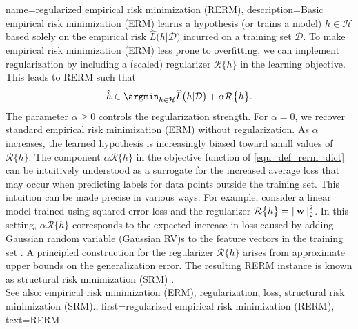 {
{name={regularized empirical risk minimization (RERM)}, 
	description={Basic empirical risk minimization (ERM) learns a hypothesis (or trains a model) $h \in \mathcal{H}$ 
		based solely on the empirical risk $\widehat{L}\big(h|\mathcal{D}\big)$ incurred on a training set $\mathcal{D}$. 
		To make empirical risk minimization (ERM) less prone to overfitting, we can implement regularization by 
		including a (scaled) regularizer $\mathcal{R}\big\{ h \big\}$ in the learning objective. 
		This leads to RERM such that
		\begin{equation}
			\label{equ_def_rerm_dict}
			\hat{h} \in \argmin_{h \in \mathcal{H}} \widehat{L}\big(h|\mathcal{D}\big) + \alpha \mathcal{R}\big\{ h \big\}.
		\end{equation}
		The parameter $\alpha \geq 0$ controls the regularization strength. 
		For $\alpha = 0$, we recover standard empirical risk minimization (ERM) without regularization. As $\alpha$ increases, the 
		learned hypothesis is increasingly biased toward small values of $\mathcal{R}\big\{ h \big\}$. 
		The component $\alpha \mathcal{R}\big\{ h \big\}$ in the objective function of \eqref{equ_def_rerm_dict} 
		can be intuitively understood as a surrogate for the increased average loss that may 
		occur when predicting labels for data points outside the training set. This intuition  
		can be made precise in various ways. For example, consider a linear model trained using squared error loss 
		and the regularizer $\mathcal{R}\big\{ h \big\} = \mleft\lVert {\bf w} \mright\rVert_{2}^{2}$. 
		In this setting, $\alpha \mathcal{R}\big\{ h \big\}$ corresponds to the expected increase in loss 
		caused by adding Gaussian random variable (Gaussian RV)s to the feature vectors in the training set 
		\cite[Ch. 3]{MLBasics}.
		A principled construction for the regularizer $\mathcal{R}\big\{ h \big\}$ 
		arises from approximate upper bounds on the generalization error. The resulting 
		RERM instance is known as structural risk minimization (SRM) \cite[Sec. 7.2]{ShalevShwartz2009}.
				\\
		See also: empirical risk minimization (ERM), regularization, loss, structural risk minimization (SRM).}, 
	first={regularized empirical risk minimization (RERM)},
	text={RERM} 
}


}
